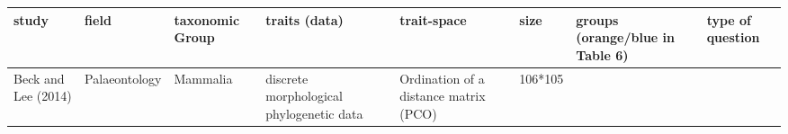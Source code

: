 \documentclass[]{article}
\begin{document}
\begin{longtable}[]{@{}llllllll@{}}
\toprule
\begin{minipage}[b]{0.06\columnwidth}\raggedright\strut
study\strut
\end{minipage} & \begin{minipage}[b]{0.08\columnwidth}\raggedright\strut
field\strut
\end{minipage} & \begin{minipage}[b]{0.1\columnwidth}\raggedright\strut
taxonomic Group\strut
\end{minipage} & \begin{minipage}[b]{0.13\columnwidth}\raggedright\strut
traits (data)\strut
\end{minipage} & \begin{minipage}[b]{0.11\columnwidth}\raggedright\strut
trait-space\strut
\end{minipage} & \begin{minipage}[b]{0.06\columnwidth}\raggedright\strut
size\strut
\end{minipage} & \begin{minipage}[b]{0.07\columnwidth}\raggedright\strut
groups (orange/blue in Table 6)\strut
\end{minipage} & \begin{minipage}[b]{0.15\columnwidth}\raggedright\strut
type of question\strut
\end{minipage}\tabularnewline
\midrule
\endhead
\begin{minipage}[t]{0.06\columnwidth}\raggedright\strut
Beck and Lee (2014)\strut
\end{minipage} & \begin{minipage}[t]{0.08\columnwidth}\raggedright\strut
Palaeontology\strut
\end{minipage} & \begin{minipage}[t]{0.1\columnwidth}\raggedright\strut
Mammalia\strut
\end{minipage} & \begin{minipage}[t]{0.13\columnwidth}\raggedright\strut
discrete morphological phylogenetic data\strut
\end{minipage} & \begin{minipage}[t]{0.11\columnwidth}\raggedright\strut
Ordination of a distance matrix (PCO)\strut
\end{minipage} & \begin{minipage}[t]{0.06\columnwidth}\raggedright\strut
106*105\strut
\end{minipage} & \begin{minipage}[t]{0.07\columnwidth}\raggedright\strut

\end{minipage}
\end{longtable}
\end{document}

